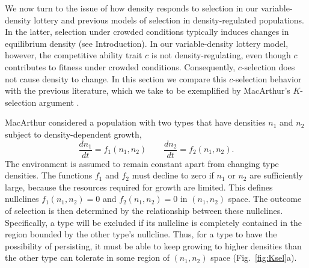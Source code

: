 \documentclass[12pt]{article}
\begin{document}
We now turn to the issue of how density responds to selection in our variable-density lottery and previous models of selection in density-regulated populations. In the latter, selection under crowded conditions typically induces changes in equilibrium density (see Introduction). In our variable-density lottery model, however, the competitive ability trait $c$ is not density-regulating, even though $c$ contributes to fitness under crowded conditions. Consequently, $c$-selection does not cause density to change. In this section we compare this $c$-selection behavior with the previous literature, which we take to be exemplified by MacArthur's $K$-selection argument \citep{macarthur_1967}.

MacArthur considered a population with two types that have densities $n_1$ and $n_2$ subject to density-dependent growth,
\begin{equation}
\frac{d n_1}{d t}=f_1(n_1,n_2)\qquad\frac{d n_2}{d t}=f_2(n_1,n_2). \label{eq:macgeneral}
\end{equation}
The environment is assumed to remain constant apart from changing type densities. The functions $f_1$ and $f_2$ must decline to zero if $n_1$ or $n_2$ are sufficiently large, because the resources required for growth are limited. This defines nullclines $f_1(n_1,n_2)=0$ and $f_2(n_1,n_2)=0$ in $(n_1,n_2)$ space. The outcome of selection is then determined by the relationship between these nullclines. Specifically, a type will be excluded if its nullcline is completely contained in the region bounded by the other type's nullcline. Thus, for a type to have the possibility of persisting, it must be able to keep growing to higher densities than the other type can tolerate in some region of $(n_1,n_2)$ space (Fig.~\ref{fig:Ksel}a).
\end{document}
